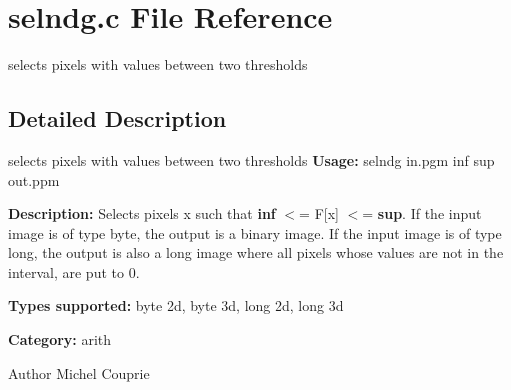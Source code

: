 \section{selndg.c File Reference}
\label{selndg_8c}


selects pixels with values between two thresholds  




\subsection{Detailed Description}
selects pixels with values between two thresholds {\bfseries Usage:} selndg in.pgm inf sup out.ppm

{\bfseries Description:} Selects pixels x such that {\bfseries inf} $<$= F[x] $<$= {\bfseries sup}. If the input image is of type byte, the output is a binary image. If the input image is of type long, the output is also a long image where all pixels whose values are not in the interval, are put to 0.

{\bfseries Types supported:} byte 2d, byte 3d, long 2d, long 3d

{\bfseries Category:} arith

\begin{DoxyAuthor}{Author}
Michel Couprie 
\end{DoxyAuthor}
